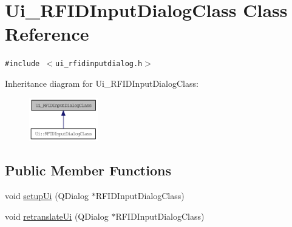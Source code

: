 \hypertarget{class_ui___r_f_i_d_input_dialog_class}{
\section{Ui\_\-RFIDInputDialogClass Class Reference}
\label{class_ui___r_f_i_d_input_dialog_class}
}
{\tt \#include $<$ui\_\-rfidinputdialog.h$>$}

Inheritance diagram for Ui\_\-RFIDInputDialogClass:\nopagebreak
\begin{figure}[H]
\begin{center}
\leavevmode
\includegraphics[width=85pt]{class_ui___r_f_i_d_input_dialog_class__inherit__graph}
\end{center}
\end{figure}
\subsection*{Public Member Functions}
\begin{CompactItemize}
\item 
void \hyperlink{class_ui___r_f_i_d_input_dialog_class_7b24e54527465a18688667456e5d3b6b}{setupUi} (QDialog $\ast$RFIDInputDialogClass)
\item 
void \hyperlink{class_ui___r_f_i_d_input_dialog_class_c8e694a988ce7c5c1b2d05e2f0ff819c}{retranslateUi} (QDialog $\ast$RFIDInputDialogClass)
\end{CompactItemize}
